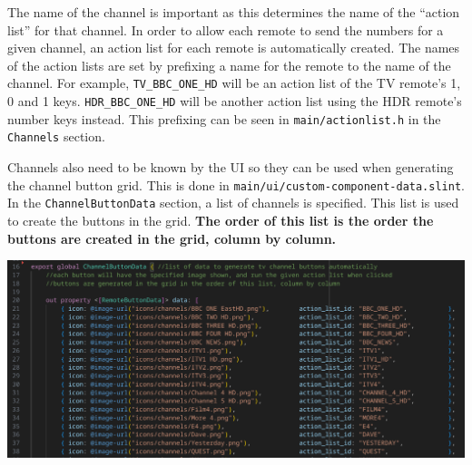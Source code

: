 \documentclass{article}
\begin{document}
The name of the channel is important as this determines the name of the ``action list'' for that channel. In order to
allow each remote to send the numbers for a given channel, an action list for each remote is automatically created. The
names of the action lists are set by prefixing a name for the remote to the name of the channel. For example,
\verb|TV_BBC_ONE_HD| will be an action list of the TV remote's 1, 0 and 1 keys. \verb|HDR_BBC_ONE_HD| will be another
action list using the HDR remote's number keys instead. This prefixing can be seen in \verb|main/actionlist.h| in the
\verb|Channels| section.

Channels also need to be known by the UI so they can be used when generating the channel button grid. This is done in
\verb|main/ui/custom-component-data.slint|. In the \verb|ChannelButtonData| section, a list of channels is specified.
This list is used to create the buttons in the grid. \textbf{The order of this list is the order the buttons are created
in the grid, column by column.}

\begin{center}
    \includegraphics[width=\textwidth]{images/channel button data.png}
\end{center}
\end{document}
